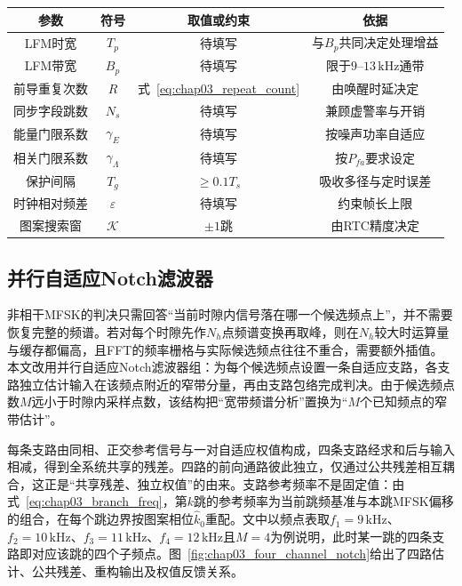 \begin{table}[htbp]
 \vspace{0.5em}\centering\wuhao
 \begin{tabular}{cccc}
 \toprule[1.5pt]
 参数 & 符号 & 取值或约束 & 依据 \\
 \midrule[1pt]
 LFM时宽 & $T_p$ & 待填写 & 与$B_p$共同决定处理增益 \\
 LFM带宽 & $B_p$ & 待填写 & 限于$9$--$13\,\mathrm{kHz}$通带 \\
 前导重复次数 & $R$ & 式~\eqref{eq:chap03_repeat_count} & 由唤醒时延决定 \\
 同步字段跳数 & $N_s$ & 待填写 & 兼顾虚警率与开销 \\
 能量门限系数 & $\gamma_E$ & 待填写 & 按噪声功率自适应 \\
 相关门限系数 & $\gamma_\Lambda$ & 待填写 & 按$P_{fa}$要求设定 \\
 保护间隔 & $T_g$ & $\ge 0.1T_s$ & 吸收多径与定时误差 \\
 时钟相对频差 & $\varepsilon$ & 待填写 & 约束帧长上限 \\
 图案搜索窗 & $\mathcal{K}$ & $\pm1$跳 & 由RTC精度决定 \\
 \bottomrule[1.5pt]
 \end{tabular}
\end{table}

\FloatBarrier

\subsection{并行自适应Notch滤波器}
\label{sec:chap03_notch}

非相干MFSK的判决只需回答“当前时隙内信号落在哪一个候选频点上”，并不需要恢复完整的频谱。若对每个时隙先作$N_h$点频谱变换再取峰，则在$N_h$较大时运算量与缓存都偏高，且FFT的频率栅格与实际候选频点往往不重合，需要额外插值。本文改用并行自适应Notch滤波器组：为每个候选频点设置一条自适应支路，各支路独立估计输入在该频点附近的窄带分量，再由支路包络完成判决。由于候选频点数$M$远小于时隙内采样点数，该结构把“宽带频谱分析”置换为“$M$个已知频点的窄带估计”。

每条支路由同相、正交参考信号与一对自适应权值构成，四条支路经求和后与输入相减，得到全系统共享的残差。四路的前向通路彼此独立，仅通过公共残差相互耦合，这正是“共享残差、独立权值”的由来。支路参考频率不是固定值：由式~\eqref{eq:chap03_branch_freq}，第$k$跳的参考频率为当前跳频基准与本跳MFSK偏移的组合，在每个跳边界按图案相位$\hat k_0$重配。文中以频点表取$f_1=9\,\mathrm{kHz}$、$f_2=10\,\mathrm{kHz}$、$f_3=11\,\mathrm{kHz}$、$f_4=12\,\mathrm{kHz}$且$M=4$为例说明，此时某一跳的四条支路即对应该跳的四个子频点。图~\ref{fig:chap03_four_channel_notch}给出了四路估计、公共残差、重构输出及权值反馈关系。

